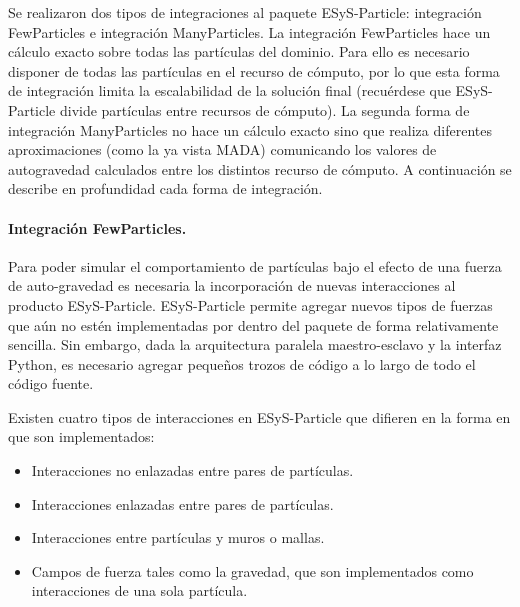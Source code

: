 \documentclass[a4paper,11pt]{book}
\begin{document}
Se realizaron dos tipos de integraciones al paquete ESyS-Particle: integración FewParticles e integración ManyParticles. La integración FewParticles hace un cálculo exacto sobre todas las partículas del dominio. Para ello es necesario disponer de todas las partículas en el recurso de cómputo, por lo que esta forma de integración limita la escalabilidad de la solución final (recuérdese que ESyS-Particle divide partículas entre recursos de cómputo). La segunda forma de integración ManyParticles no hace un cálculo exacto sino que realiza diferentes aproximaciones (como la ya vista MADA) comunicando los valores de autogravedad calculados entre los distintos recurso de cómputo. A continuación se describe en profundidad cada forma de integración.

\paragraph{Integración FewParticles.}
Para poder simular el comportamiento de partículas bajo el efecto de una fuerza de auto-gravedad es necesaria la incorporación de nuevas interacciones al producto ESyS-Particle.
ESyS-Particle permite agregar nuevos tipos de fuerzas que aún no estén implementadas por dentro del paquete de forma relativamente sencilla. Sin embargo, dada la arquitectura paralela maestro-esclavo y la interfaz Python, es necesario agregar pequeños trozos de código a lo largo de todo el código fuente.

Existen cuatro tipos de interacciones en ESyS-Particle que difieren en la forma en que son implementados:
\begin{itemize}
	\item Interacciones no enlazadas entre pares de partículas.
	\item Interacciones enlazadas entre pares de partículas.
	\item Interacciones entre partículas y muros o mallas.
	\item Campos de fuerza tales como la gravedad, que son implementados como interacciones de una sola partícula.
\end{itemize}

\end{document}
